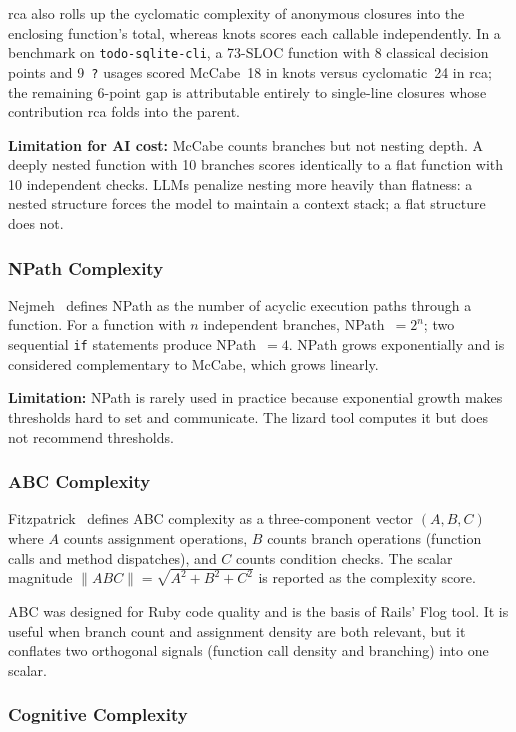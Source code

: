 \documentclass[10pt,twocolumn,letterpaper]{article}
\begin{document}
rca also rolls up the cyclomatic complexity of anonymous closures into the
enclosing function's total, whereas knots scores each callable
independently.  In a benchmark on \texttt{todo-sqlite-cli}, a 73-SLOC
function with 8 classical decision points and 9~\texttt{?} usages scored
McCabe~18 in knots versus cyclomatic~24 in rca; the remaining 6-point gap
is attributable entirely to single-line closures whose contribution rca
folds into the parent.

\textbf{Limitation for AI cost:} McCabe counts branches but not nesting
depth.  A deeply nested function with 10 branches scores identically to a
flat function with 10 independent checks.  LLMs penalize nesting more
heavily than flatness: a nested structure forces the model to maintain a
context stack; a flat structure does not.

\subsubsection{NPath Complexity}

Nejmeh~\cite{npath} defines NPath as the number of acyclic execution paths
through a function.  For a function with $n$ independent branches,
NPath~$= 2^n$; two sequential \texttt{if} statements produce NPath~$= 4$.
NPath grows exponentially and is considered complementary to McCabe, which
grows linearly.

\textbf{Limitation:} NPath is rarely used in practice because exponential
growth makes thresholds hard to set and communicate.  The lizard tool
computes it but does not recommend thresholds.

\subsubsection{ABC Complexity}

Fitzpatrick~\cite{abc} defines ABC complexity as a three-component vector
$(A, B, C)$ where $A$ counts assignment operations, $B$ counts branch
operations (function calls and method dispatches), and $C$ counts condition
checks.  The scalar magnitude $\|ABC\| = \sqrt{A^2 + B^2 + C^2}$ is
reported as the complexity score.

ABC was designed for Ruby code quality and is the basis of Rails' Flog
tool.  It is useful when branch count and assignment density are both
relevant, but it conflates two orthogonal signals (function call density
and branching) into one scalar.

\subsubsection{Cognitive Complexity}
\end{document}
